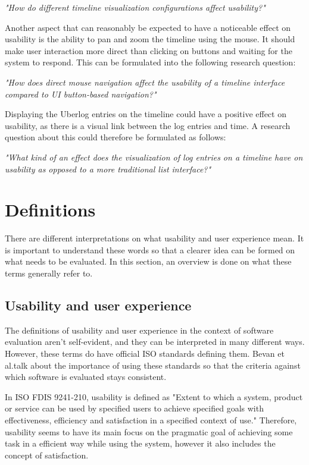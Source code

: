 \textit{"How do different timeline visualization configurations affect usability?"}

Another aspect that can reasonably be expected to have a noticeable effect on usability is the ability to pan and zoom the timeline using the mouse. It should make user interaction more direct than clicking on buttons and waiting for the system to respond. This can be formulated into the following research question:

\textit{"How does direct mouse navigation affect the usability of a timeline interface compared to UI button-based navigation?"}

Displaying the Uberlog entries on the timeline could have a positive effect on usability, as there is a visual link between the log entries and time. A research question about this could therefore be formulated as follows:

\textit{"What kind of an effect does the visualization of log entries on a timeline have on usability as opposed to a more traditional list interface?"}

\section{Definitions}
There are different interpretations on what usability and user experience mean. It is important to understand these words so that a clearer idea can be formed on what needs to be evaluated. In this section, an overview is done on what these terms generally refer to.

\subsection{Usability and user experience} \label{definitions_section}
The definitions of usability and user experience in the context of software evaluation aren't self-evident, and they can be interpreted in many different ways. However, these terms do have official ISO standards defining them. Bevan et al.talk about the importance of using these standards so that the criteria against which software is evaluated stays consistent. \cite{bevanstandard}

In  ISO FDIS 9241-210, usability is defined as "Extent to which  a system, product or service can be used by specified users to achieve specified goals with effectiveness, efficiency and satisfaction in a specified context of use." Therefore, usability seems to have its main focus on the pragmatic goal of achieving some task in a efficient way while using the system, however it also includes the concept of satisfaction.

